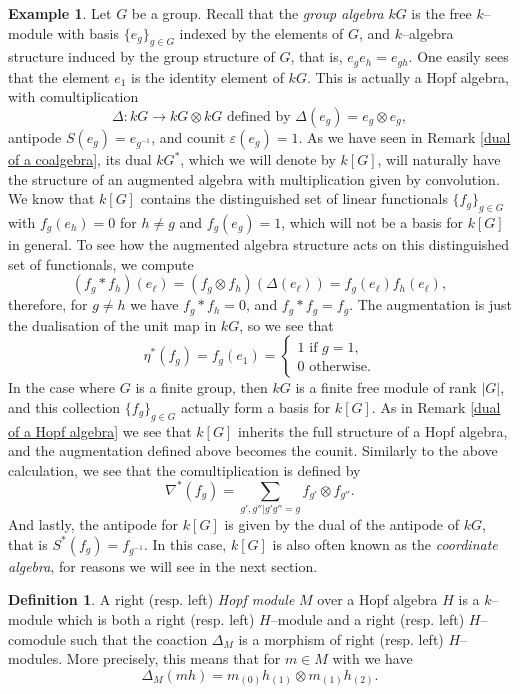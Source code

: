 \documentclass{article}
\theoremstyle{plain}
\theoremstyle{definition}
\newtheorem{Def}[Th]{Definition}
\newtheorem{Ex}[Th]{Example}
\begin{document}
\begin{Ex}
    Let $G$ be a group. Recall that the \textit{group algebra} $kG$ is the free $k$--module with basis $\{e_g\}_{g\in G}$ indexed by the elements of $G$, and $k$--algebra structure induced by the group structure of $G$, that is, $e_ge_h=e_{gh}$. One easily sees that the element $e_1$ is the identity element of $kG$. This is actually a Hopf algebra, with comultiplication 
    \[
    \Delta\colon kG\to kG\otimes kG \mbox{ defined by } \Delta(e_g)=e_g\otimes e_g,
    \]
    antipode $S(e_g)=e_{g^{-1}}$, and counit $\varepsilon(e_g)=1$. As we have seen in Remark \ref{dual of a coalgebra}, its dual $kG^*$, which we will denote by $k[G]$, will naturally have the structure of an augmented algebra with multiplication given by convolution. We know that $k[G]$ contains the distinguished set of linear functionals $\{f_g\}_{g\in G}$ with $f_g(e_h)=0$ for $h\neq g$ and $f_g(e_g)=1$, which will not be a basis for $k[G]$ in general. To see how the augmented algebra structure acts on this distinguished set of functionals, we compute 
    \[
    (f_g \ast f_h)(e_\ell) = (f_g\otimes f_h)(\Delta(e_\ell))=f_g(e_\ell)f_h(e_\ell),
    \]
    therefore, for  $g\neq h$ we have $f_g\ast f_h =0$, and $f_g\ast f_g = f_g$. The augmentation is just the dualisation of the unit map in $kG$, so we see that
\[
\eta^*(f_g)=f_g(e_1)=\begin{cases} 1 \text{ if $g=1$}, \\
    0 \text{ otherwise}.
    \end{cases}
\]
    In the case where $G$ is a finite group, then $kG$ is a finite free module of rank $|G|$, and this collection $\{f_g\}_{g\in G}$ actually form a basis for $k[G]$. As in Remark \ref{dual of a Hopf algebra} we see that $k[G]$ inherits the full structure of a Hopf algebra, and the augmentation defined above becomes the counit. Similarly to the above calculation, we see that the comultiplication is defined by 
    \[
    \nabla^*(f_g)=\sum_{g', g'' | g'g''=g}f_{g'}\otimes f_{g''}.
    \]
    And lastly, the antipode for $k[G]$ is given by the dual of the antipode of $kG$, that is $S^*(f_g)=f_{g^{-1}}$. In this case, $k[G]$ is also often known as the \textit{coordinate algebra}, for reasons we will see in the next section.
\end{Ex}

\begin{Def}
    A right (resp. left) \textit{Hopf module} $M$ over a Hopf algebra $H$ is a $k$--module which is both a right (resp. left) $H$--module and a right (resp. left) $H$--comodule such that the coaction $\Delta_M$ is a morphism of right (resp. left) $H$--modules. More precisely, this means that for $m\in M$ with we have 
    \[
    \Delta_M(mh)=m_{(0)}h_{(1)}\otimes m_{(1)}h_{(2)}.
    \]
\end{Def}
\end{document}
